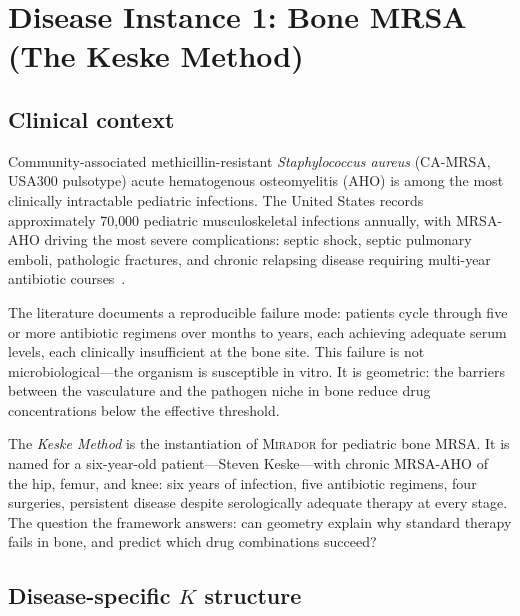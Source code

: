 \documentclass[11pt]{article}
\theoremstyle{plain}
\theoremstyle{definition}
\newcommand{\mirador}{\textsc{Mirador}}
\begin{document}
\section{Disease Instance 1: Bone MRSA (The Keske Method)}
\label{sec:bone}

\subsection{Clinical context}
\label{sec:bone-context}

Community-associated methicillin-resistant \emph{Staphylococcus aureus}
(CA-MRSA, USA300 pulsotype) acute hematogenous osteomyelitis (AHO)
is among the most clinically intractable pediatric infections. The
United States records approximately 70{,}000 pediatric
musculoskeletal infections annually, with MRSA-AHO driving the most
severe complications: septic shock, septic pulmonary emboli,
pathologic fractures, and chronic relapsing disease requiring
multi-year antibiotic courses~\cite{Arnold2006, Saavedra2008}.

The literature documents a reproducible failure mode: patients cycle
through five or more antibiotic regimens over months to years, each
achieving adequate serum levels, each clinically insufficient at
the bone site. This failure is not microbiological---the organism
is susceptible in vitro. It is geometric: the barriers between
the vasculature and the pathogen niche in bone reduce drug
concentrations below the effective threshold.

The \emph{Keske Method} is the instantiation of \mirador{} for
pediatric bone MRSA. It is named for a six-year-old patient---Steven
Keske---with chronic MRSA-AHO of the hip, femur, and knee: six years
of infection, five antibiotic regimens, four surgeries, persistent
disease despite serologically adequate therapy at every stage. The
question the framework answers: can geometry explain why standard
therapy fails in bone, and predict which drug combinations succeed?

\subsection{Disease-specific \texorpdfstring{$K$}{K} structure}
\label{sec:bone-k}
\end{document}
